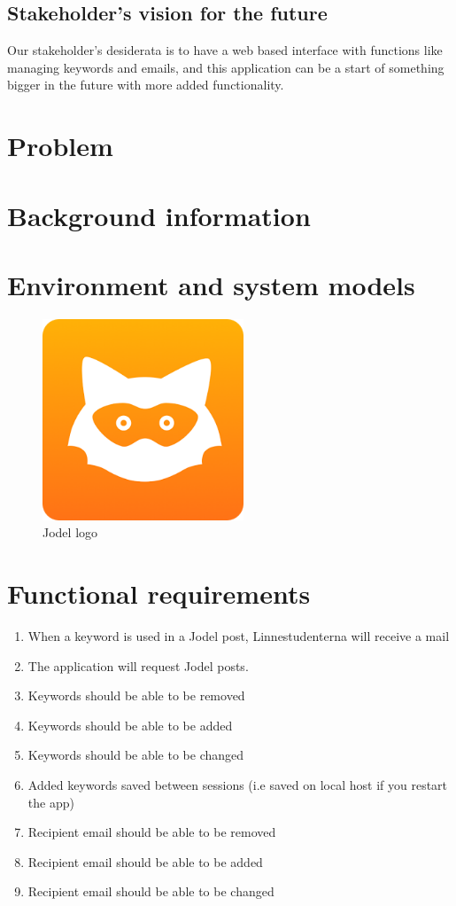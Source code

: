 \documentclass[a4paper,12pt]{article}
\begin{document}
\subsection{Stakeholder's vision for the future}
Our stakeholder's desiderata is to have a web based interface with functions like managing keywords and emails, and this application can be a start of something bigger in the future with more added functionality.

\section{Problem}

\section{Background information}

\section{Environment and system models}

\begin{figure}[!h]
	\centering
	\includegraphics[height=6cm]{img/jodel.png}
	\caption{Jodel logo}
	\label{Cisco routing}
\end{figure}
\section{Functional requirements}
\begin{enumerate}
	\item When a keyword is used in a Jodel post, Linnestudenterna will receive a mail
	\item The application will request Jodel posts.
	\item Keywords should be able to be removed
	\item Keywords should be able to be added
	\item Keywords should be able to be changed
	\item Added keywords saved between sessions (i.e saved on local host if you restart the app)
	\item Recipient email should be able to be removed
	\item Recipient email should be able to be added
	\item Recipient email should be able to be changed
\end{enumerate}
\end{document}

